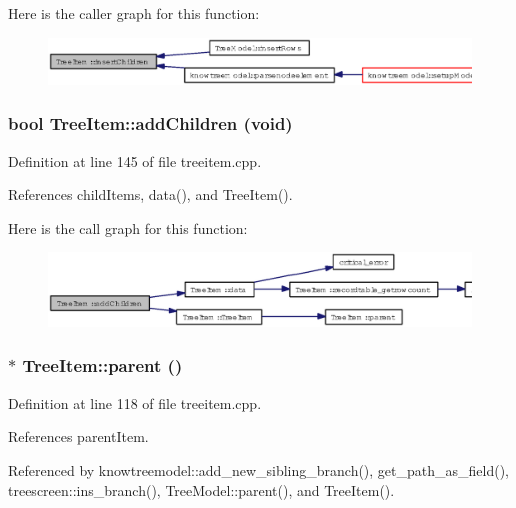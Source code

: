 Here is the caller graph for this function:\begin{figure}[H]
\begin{center}
\leavevmode
\includegraphics[width=320pt]{classTreeItem_d6b6da67cc03e79c714419f93f5005c6_icgraph}
\end{center}
\end{figure}
\subsubsection{\setlength{\rightskip}{0pt plus 5cm}bool Tree\-Item::add\-Children (void)}\label{classTreeItem_fcb572391879aa48a2ca55b43b4d987d}




Definition at line 145 of file treeitem.cpp.

References child\-Items, data(), and Tree\-Item().

Here is the call graph for this function:\begin{figure}[H]
\begin{center}
\leavevmode
\includegraphics[width=357pt]{classTreeItem_fcb572391879aa48a2ca55b43b4d987d_cgraph}
\end{center}
\end{figure}
\subsubsection{ $\ast$ Tree\-Item::parent ()}\label{classTreeItem_392ec493dfab91ee474d7ff83e2c0211}




Definition at line 118 of file treeitem.cpp.

References parent\-Item.

Referenced by knowtreemodel::add\_\-new\_\-sibling\_\-branch(), get\_\-path\_\-as\_\-field(), treescreen::ins\_\-branch(), Tree\-Model::parent(), and Tree\-Item().

